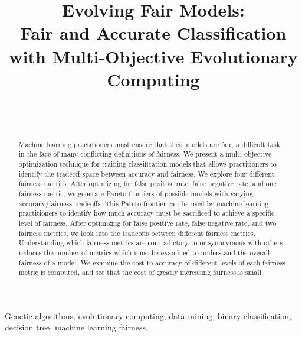 \documentclass[twoside]{article}
\begin{document}
\title{\bf Evolving Fair Models: \\
Fair and Accurate Classification with Multi-Objective Evolutionary Computing}  

\author{ \hfill {}\\ 
\AND
        \hfill {}\\
}

\maketitle

\begin{abstract}

Machine learning practitioners must ensure that their models are fair, a difficult task in the face of many conflicting definitions of fairness. We present a multi-objective optimization technique for training classification models that allows practitioners to identify the tradeoff space between accuracy and fairness. We explore four different fairness metrics. After optimizing for false positive rate, false negative rate, and one fairness metric, we generate Pareto frontiers of possible models with varying accuracy/fairness tradeoffs. This Pareto frontier can be used by machine learning practitioners to identify how much accuracy must be sacrificed to achieve a specific level of fairness. After optimizing for false positive rate, false negative rate, and two fairness metrics, we look into the tradeoffs between different fairness metrics. Understanding which fairness metrics are contradictory to or synonymous with others reduces the number of metrics which must be examined to understand the overall fairness of a model. We examine the cost to accuracy of different levels of each fairness metric is computed, and see that the cost of greatly increasing fairness is small.
\end{abstract}

\begin{keywords}

Genetic algorithms, 
evolutionary computing,
data mining, 
binary classification, 
decision tree, 
machine learning fairness.

\end{keywords}
\end{document}
